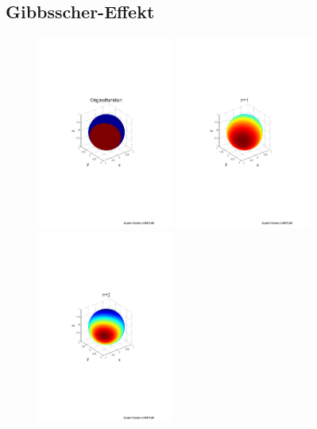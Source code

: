 \begin{refsection}
\section{Gibbsscher-Effekt} 

\begin{figure}%
\centering
\includegraphics[width=0.4\textwidth]{kugel/Gibbs/GibbsOriginalFunktion.pdf}
\includegraphics[width=0.4\textwidth]{kugel/Gibbs/GibbsN_1.pdf}
\includegraphics[width=0.4\textwidth]{kugel/Gibbs/GibbsN_2.pdf}

\end{figure}
\end{refsection}
